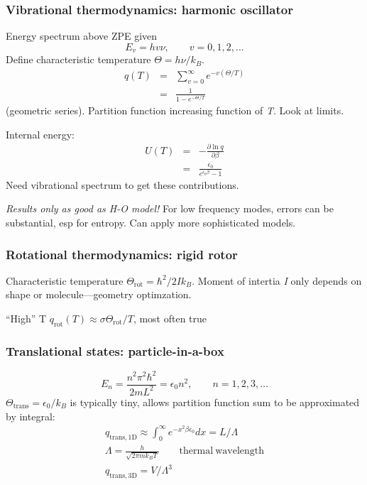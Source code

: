 \documentclass[11pt]{article}
\begin{document}
\subsubsection{Vibrational thermodynamics: harmonic oscillator}
\label{sec:orgef81844}
Energy spectrum above ZPE given
\begin{equation}
  E_v=hv\nu,\qquad v=0,1,2,...
\end{equation}
Define characteristic temperature \(\Theta =h \nu/k_B\).
\begin{eqnarray}
q(T) & = &\sum_{v=0}^\infty e^{-v(\Theta/T)} \\
 & = & \frac{1}{1-e^{-\Theta/T}}
\end{eqnarray}
(geometric series). Partition function increasing function of \emph{T}.  Look at limits.

\noindent Internal energy:
\begin{eqnarray}
  U(T) &=&-\frac{\partial \ln q}{\partial \beta}\\
   & = & \frac{\epsilon_0}{e^{\epsilon_0\beta}-1}
\end{eqnarray}
Need vibrational spectrum to get these contributions.

\emph{Results only as good as H-O model!} For low frequency modes, errors can be substantial, esp for entropy.  Can apply more sophisticated models.

\subsubsection{Rotational thermodynamics: rigid  rotor}
\label{sec:orgb45a5e7}
Characteristic temperature \(\Theta_\mathrm{rot} = \hbar^2/2 I k_B\).  Moment of intertia \emph{I} only depends on shape or molecule---geometry optimzation. 

``High'' T \(q_\mathrm{rot}(T) \approx \sigma \Theta_\mathrm{rot}/T\), most often true
\subsubsection{Translational states: particle-in-a-box}
\label{sec:org7308081}
\[
  E_n=\frac{n^2\pi^2\hbar^2}{2 m L^2} = \epsilon_0n^2,\qquad n=1,2,3,\ldots
\]
\(\Theta_\mathrm{trans} = \epsilon_0/k_B\) is typically tiny, allows partition function sum to be approximated by integral:
\begin{eqnarray*}
q_\mathrm{trans,1D} \approx \int_0^\infty e^{-x^2\beta\epsilon_0}dx =
             L/\Lambda \\
             \Lambda = \frac{h}{\sqrt{2\pi m k_B T}} \qquad
             \mathrm{thermal\ wavelength} \\
             q_\mathrm{trans,3D} = V/\Lambda^3
           \end{eqnarray*}
\end{document}
